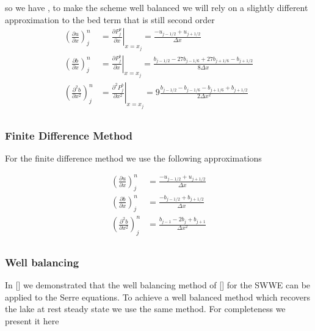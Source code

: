 so we have , to make the scheme well balanced we will rely on a slightly different approximation to the bed term that is still second order
\begin{align*}
\left( \frac{\partial {u}}{\partial x} \right)^n_j & = \left. \frac{\partial P^u_j}{\partial x} \right\rvert_{x= x_j} = \frac{-u_{j-1/2} + u_{j+1/2}}{\Delta x} \\
\left( \frac{\partial b}{\partial x} \right)^n_j &  = \left. \frac{\partial P^b_j}{\partial x} \right\rvert_{x= x_j} = \frac{b_{j-1/2} - 27b_{j-1/6} + 27b_{j+1/6} - b_{j+1/2}}{8\Delta x}  \\
\left( \frac{\partial^2 b}{\partial x^2} \right)^n_j & = \left. \frac{\partial^2 P^b_j}{\partial x^2} \right\rvert_{x= x_j} = 9\frac{b_{j-1/2} - b_{j-1/6} -  b_{j+1/6} + b_{j+1/2}}{2\Delta x^2} \\
\end{align*}


\subsubsection{Finite Difference Method}
For the finite difference method we use the following approximations

\begin{align*}
\left( \frac{\partial {u}}{\partial x} \right)^n_j &  = \frac{-u_{j-1/2} +   u_{j+1/2}}{\Delta x} \\
\left( \frac{\partial b}{\partial x} \right)^n_j &  = \frac{-b_{j-1/2} + b_{j+1/2}}{\Delta x}  \\
\left( \frac{\partial^2 b}{\partial x^2} \right)^n_j & = \frac{b_{j-1} - 2b_{j} + b_{j+1}}{\Delta x^2} \\
\end{align*}

\subsubsection{Well balancing}
In [] we demonstrated that the well balancing method of [] for the SWWE can be applied to the Serre equations. To achieve a well balanced method which recovers the lake at rest steady state we use the same method. For completeness we present it here

